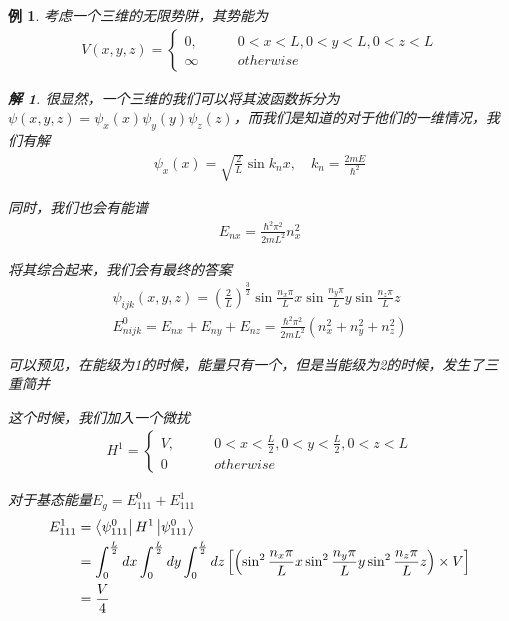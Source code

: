 \documentclass{article}
\newtheorem{example}{例}
\newtheorem{solution}{解}
\begin{document}
\begin{example}
	考虑一个三维的无限势阱，其势能为
	\begin{align*}
		V(x,y,z)=
		\begin{cases}
			0,     & \quad\quad 0<x<L,0<y<L,0<z<L \\
			\infty & \quad\quad otherwise
		\end{cases}
	\end{align*}
	\begin{solution}
		很显然，一个三维的我们可以将其波函数拆分为$\psi(x,y,z)=\psi_x(x)\psi_y(y)\psi_z(z)$，而我们是知道的对于他们的一维情况，我们有解
		\begin{align*}
			\psi_{x}(x)=\sqrt{\frac{2}{L}}\sin{k_nx},\quad k_n=\frac{2mE}{\hbar^2}
		\end{align*}

		同时，我们也会有能谱
		\begin{align*}
			E_{nx}=\frac{\hbar^2\pi^2}{2mL^2}n_x^2
		\end{align*}

		将其综合起来，我们会有最终的答案
		\begin{align*}
			\psi_{ijk}(x,y,z)=\left(\frac{2}{L}\right)^{\frac{3}{2}}\sin{\frac{n_x\pi}{L}x}\sin{\frac{n_y\pi}{L}y}\sin{\frac{n_z\pi}{L}z} \\
			E_{n ijk}^0=E_{nx}+E_{ny}+E_{nz}=\frac{\hbar^2\pi^2}{2mL^2}\left(n_x^2+n_y^2+n_z^2\right)
		\end{align*}

		可以预见，在能级为1的时候，能量只有一个，但是当能级为2的时候，发生了三重简并

		这个时候，我们加入一个微扰
		\begin{align*}
			H^1=
			\begin{cases}
				V, & \quad\quad 0<x<\frac{L}{2},0<y<\frac{L}{2},0<z<L \\
				0  & \quad\quad otherwise
			\end{cases}
		\end{align*}

		对于基态能量$E_g=E_{111}^0+E_{111}^1$
		\begin{align*}
			E_{111}^1 & =\bra{\psi_{111}^0}H^1\ket{\psi_{111}^0}                                                                                                                                                   \\
			          & =\int_{0}^{\frac{L}{2}} dx\int_{0}^{\frac{L}{2}} dy\int_{0}^{\frac{L}{2}} dz \left[\left(\sin^2{\frac{n_x\pi}{L}x}\sin^2{\frac{n_y\pi}{L}y}\sin^2{\frac{n_z\pi}{L}z}\right)\times V\right] \\
			          & =\frac{V}{4}
		\end{align*}


\end{solution}
\end{example}
\end{document}
